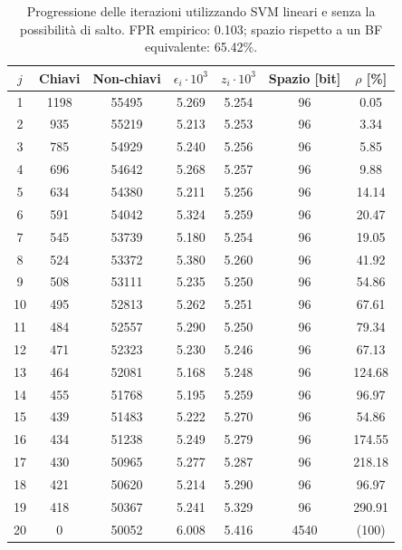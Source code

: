 \begin{table}
\centering
\begin{tabular}{|c|c|c|c|c|c|c|}
\hline
$j$ & Chiavi & Non-chiavi & $\epsilon_i \cdot 10^3$ & $z_i \cdot 10^3$ & Spazio [bit] & $\rho$ [\%] \\
\hline
1  & 1198  & 55495 & 5.269 & 5.254 & 96   & 0.05 \\
2  & 935   & 55219 & 5.213 & 5.253 & 96   & 3.34 \\
3  & 785   & 54929 & 5.240 & 5.256 & 96   & 5.85 \\
4  & 696   & 54642 & 5.268 & 5.257 & 96   & 9.88 \\
5  & 634   & 54380 & 5.211 & 5.256 & 96   & 14.14 \\
6  & 591   & 54042 & 5.324 & 5.259 & 96   & 20.47 \\
7  & 545   & 53739 & 5.180 & 5.254 & 96   & 19.05 \\
8  & 524   & 53372 & 5.380 & 5.260 & 96   & 41.92 \\
9  & 508   & 53111 & 5.235 & 5.250 & 96   & 54.86 \\
10 & 495   & 52813 & 5.262 & 5.251 & 96   & 67.61 \\
11 & 484   & 52557 & 5.290 & 5.250 & 96   & 79.34 \\
12 & 471   & 52323 & 5.230 & 5.246 & 96   & 67.13 \\
13 & 464   & 52081 & 5.168 & 5.248 & 96   & 124.68 \\
14 & 455   & 51768 & 5.195 & 5.259 & 96   & 96.97 \\
15 & 439   & 51483 & 5.222 & 5.270 & 96   & 54.86 \\
16 & 434   & 51238 & 5.249 & 5.279 & 96   & 174.55 \\
17 & 430   & 50965 & 5.277 & 5.287 & 96   & 218.18 \\
18 & 421   & 50620 & 5.214 & 5.290 & 96   & 96.97 \\
19 & 418   & 50367 & 5.241 & 5.329 & 96   & 290.91 \\
20 & 0     & 50052 & 6.008 & 5.416 & 4540 & (100) \\
\hline
\end{tabular}
\caption{Progressione delle iterazioni utilizzando SVM lineari e senza la possibilità di salto. FPR empirico: 0.103; spazio rispetto a un BF equivalente: 65.42\%.}
\label{tab:svm-no-skip}
\end{table}
